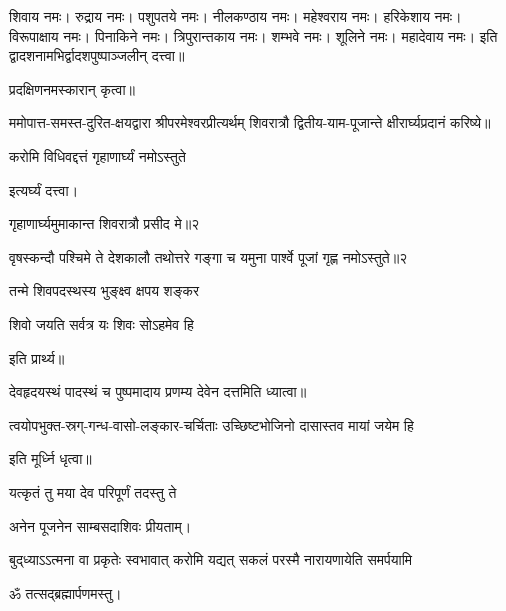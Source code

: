 शिवाय नमः। रुद्राय नमः। पशुपतये नमः। नीलकण्ठाय नमः। महेश्वराय नमः। हरिकेशाय नमः। विरूपाक्षाय नमः। पिनाकिने नमः। त्रिपुरान्तकाय नमः। शम्भवे नमः। शूलिने नमः। महादेवाय नमः। इति द्वादशनामभिर्द्वादशपुष्पाञ्जलीन् दत्त्वा॥

प्रदक्षिणनमस्कारान् कृत्वा॥

ममोपात्त-समस्त-दुरित-क्षयद्वारा श्रीपरमेश्वरप्रीत्यर्थम् शिवरात्रौ द्वितीय-याम-पूजान्ते क्षीरार्घ्यप्रदानं करिष्ये॥

{करोमि विधिवद्दत्तं गृहाणार्घ्यं नमोऽस्तुते}

इत्यर्घ्यं दत्त्वा।
\medskip

{गृहाणार्घ्यमुमाकान्त शिवरात्रौ प्रसीद मे॥२}


{वृषस्कन्दौ पश्चिमे ते देशकालौ तथोत्तरे}
{गङ्गा च यमुना पार्श्वे पूजां गृह्ण नमोऽस्तुते॥२}


{तन्मे शिवपदस्थस्य भुङ्क्ष्व क्षपय शङ्कर}

{शिवो जयति सर्वत्र यः शिवः सोऽहमेव हि}

इति प्रार्थ्य॥

 देवहृदयस्थं पादस्थं च पुष्पमादाय प्रणम्य देवेन दत्तमिति ध्यात्वा॥

{त्वयोपभुक्त-स्रग्-गन्ध-वासो-लङ्कार-चर्चिताः}
{उच्छिष्टभोजिनो दासास्तव मायां जयेम हि}

इति मूर्ध्नि धृत्वा॥

{यत्कृतं तु मया देव परिपूर्णं तदस्तु ते}


अनेन पूजनेन साम्बसदाशिवः प्रीयताम्। 

{बुद्‌ध्याऽऽत्मना वा प्रकृतेः स्वभावात्}
{करोमि यद्यत् सकलं परस्मै}
{नारायणायेति समर्पयामि}


ॐ तत्सद्ब्रह्मार्पणमस्तु।\medskip

